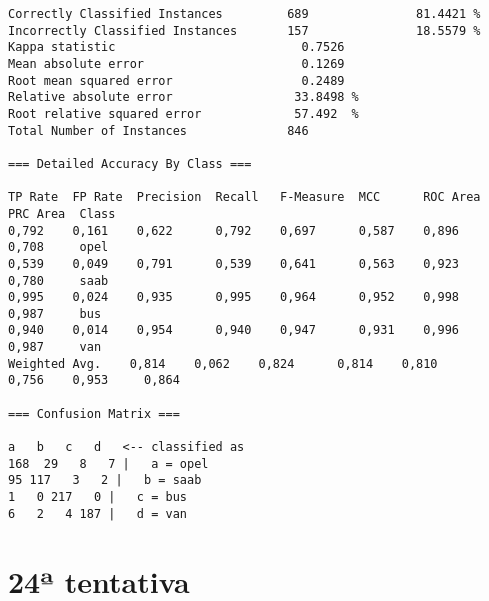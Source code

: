 \documentclass[
	article,			%
	11pt,				%
	oneside,			%
	a4paper,			%
	english,			%
	brazil,				%
	sumario=tradicional
	]{abntex2}
\begin{document}
\begin{lstlisting}
Correctly Classified Instances         689               81.4421 %
Incorrectly Classified Instances       157               18.5579 %
Kappa statistic                          0.7526
Mean absolute error                      0.1269
Root mean squared error                  0.2489
Relative absolute error                 33.8498 %
Root relative squared error             57.492  %
Total Number of Instances              846     

=== Detailed Accuracy By Class ===

TP Rate  FP Rate  Precision  Recall   F-Measure  MCC      ROC Area  PRC Area  Class
0,792    0,161    0,622      0,792    0,697      0,587    0,896     0,708     opel
0,539    0,049    0,791      0,539    0,641      0,563    0,923     0,780     saab
0,995    0,024    0,935      0,995    0,964      0,952    0,998     0,987     bus
0,940    0,014    0,954      0,940    0,947      0,931    0,996     0,987     van
Weighted Avg.    0,814    0,062    0,824      0,814    0,810      0,756    0,953     0,864     

=== Confusion Matrix ===

a   b   c   d   <-- classified as
168  29   8   7 |   a = opel
95 117   3   2 |   b = saab
1   0 217   0 |   c = bus
6   2   4 187 |   d = van

\end{lstlisting}

\newpage

\section{24ª tentativa}
\end{document}
